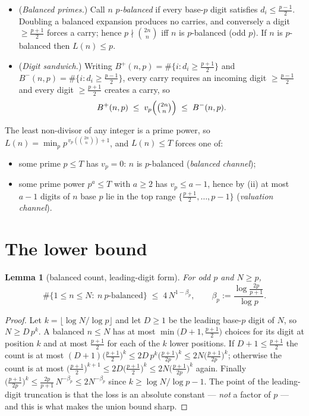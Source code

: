 \documentclass[11pt]{article}
\newtheorem{lemma}[theorem]{Lemma}
\begin{document}
\begin{itemize}
\item[(i)] (\emph{Balanced primes.})  Call $n$ \emph{$p$-balanced} if every
base-$p$ digit satisfies $d_i\le\frac{p-1}2$.  Doubling a balanced expansion
produces no carries, and conversely a digit $\ge\frac{p+1}2$ forces a carry;
hence $p\nmid\binom{2n}{n}$ iff $n$ is $p$-balanced (odd $p$).  If $n$ is
$p$-balanced then $L(n)\le p$.
\item[(ii)] (\emph{Digit sandwich.})  Writing $B^+(n,p)=\#\{i:d_i\ge\frac{p+1}2\}$
and $B^-(n,p)=\#\{i:d_i\ge\frac{p-1}2\}$, every carry requires an incoming
digit $\ge\frac{p-1}2$ and every digit $\ge\frac{p+1}2$ creates a carry, so
\[
B^+(n,p)\;\le\;v_p\Bigl(\tbinom{2n}{n}\Bigr)\;\le\;B^-(n,p).
\]
\end{itemize}

The least non-divisor of any integer is a prime power, so
$L(n)=\min_p p^{\,v_p(\binom{2n}{n})+1}$, and $L(n)\le T$ forces one of:
\begin{itemize}
\item[(I)] some prime $p\le T$ has $v_p=0$: $n$ is $p$-balanced
(\emph{balanced channel});
\item[(II)] some prime power $p^a\le T$ with $a\ge2$ has $v_p\le a-1$, hence
by (ii) at most $a-1$ digits of $n$ base $p$ lie in the top range
$\{\frac{p+1}2,\dots,p-1\}$ (\emph{valuation channel}).
\end{itemize}

\section{The lower bound}

\begin{lemma}[balanced count, leading-digit form]\label{lem:bal}
For odd $p$ and $N\ge p$,
\[
\#\{1\le n\le N:\ n\ \text{$p$-balanced}\}\;\le\;4\,N^{1-\beta_p},
\qquad
\beta_p:=\frac{\log\frac{2p}{p+1}}{\log p}.
\]
\end{lemma}

\begin{proof}
Let $k=\lfloor\log N/\log p\rfloor$ and let $D\ge1$ be the leading base-$p$
digit of $N$, so $N\ge D\,p^{k}$.  A balanced $n\le N$ has at most
$\min\bigl(D+1,\tfrac{p+1}2\bigr)$ choices for its digit at position $k$ and
at most $\tfrac{p+1}2$ for each of the $k$ lower positions.  If
$D+1\le\tfrac{p+1}2$ the count is at most
$(D+1)\bigl(\tfrac{p+1}2\bigr)^{k}\le2D\,p^{k}\bigl(\tfrac{p+1}{2p}\bigr)^{k}
\le2N\bigl(\tfrac{p+1}{2p}\bigr)^{k}$; otherwise the count is at most
$\bigl(\tfrac{p+1}2\bigr)^{k+1}\le 2D\bigl(\tfrac{p+1}2\bigr)^{k}\le
2N\bigl(\tfrac{p+1}{2p}\bigr)^{k}$ again.  Finally
$\bigl(\tfrac{p+1}{2p}\bigr)^{k}\le\tfrac{2p}{p+1}\,N^{-\beta_p}\le2N^{-\beta_p}$
since $k\ge\log N/\log p-1$.  The point of the leading-digit truncation is
that the loss is an absolute constant --- \emph{not} a factor of $p$ --- and
this is what makes the union bound sharp.
\end{proof}
\end{document}
